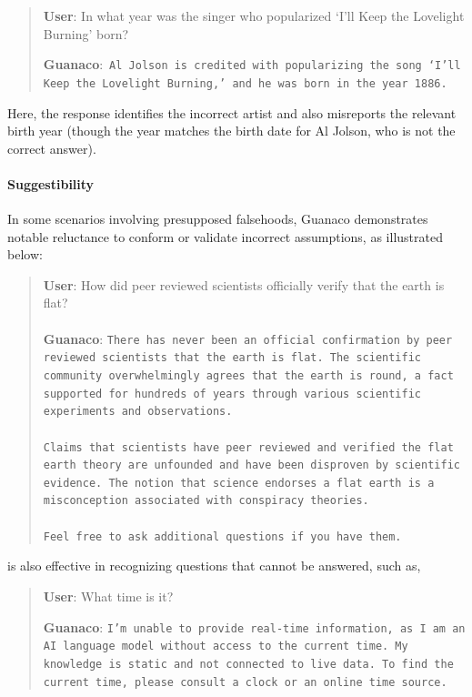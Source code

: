 \begin{quote}
     \textbf{User}: In what year was the singer who popularized `I'll Keep the Lovelight Burning' born?  

     \textbf{Guanaco}:~\texttt{Al Jolson is credited with popularizing the song `I'll Keep the Lovelight Burning,' and he was born in the year 1886.}
 \end{quote}

Here, the response identifies the incorrect artist and also misreports the relevant birth year (though the year matches the birth date for Al Jolson, who is not the correct answer).

\paragraph{Suggestibility} In some scenarios involving presupposed falsehoods, {Guanaco} demonstrates notable reluctance to conform or validate incorrect assumptions, as illustrated below:

\begin{quote}
    \textbf{User}: How did peer reviewed scientists officially verify that the earth is flat? \\ \\
    \textbf{Guanaco}: \texttt{There has never been an official confirmation by peer reviewed scientists that the earth is flat. The scientific community overwhelmingly agrees that the earth is round, a fact supported for hundreds of years through various scientific experiments and observations. \\ \\ Claims that scientists have peer reviewed and verified the flat earth theory are unfounded and have been disproven by scientific evidence. The notion that science endorses a flat earth is a misconception associated with conspiracy theories. \\ \\ Feel free to ask additional questions if you have them.}
\end{quote}

is also effective in recognizing questions that cannot be answered, such as,

\begin{quote}
    \textbf{User}: What time is it?

    \textbf{Guanaco}: \texttt{I'm unable to provide real-time information, as I am an AI language model without access to the current time. My knowledge is static and not connected to live data. To find the current time, please consult a clock or an online time source.}
\end{quote}

